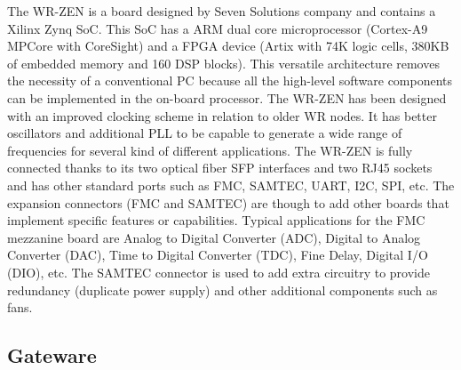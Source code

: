 \documentclass[review]{elsarticle}
\begin{document}
The WR-ZEN is a board designed by Seven Solutions company and contains a Xilinx Zynq SoC. This SoC has a ARM dual core microprocessor (Cortex-A9 MPCore with CoreSight) and a FPGA device (Artix with 74K logic cells, 380KB of embedded memory and 160 DSP blocks). This versatile architecture removes the necessity of a conventional PC because all the high-level software components can be implemented in the on-board processor. The WR-ZEN has been designed with an improved clocking scheme in relation to older WR nodes. It has better oscillators and additional PLL to be capable to generate a wide range of frequencies for several kind of different applications. The WR-ZEN is fully connected thanks to its two optical fiber SFP interfaces and two RJ45 sockets and has other standard ports such as FMC, SAMTEC, UART, I2C, SPI, etc. The expansion connectors (FMC and SAMTEC) are though to add other boards that implement specific features or capabilities. Typical applications for the FMC mezzanine board are Analog to Digital Converter (ADC), Digital to Analog Converter (DAC), Time to Digital Converter (TDC), Fine Delay, Digital I/O (DIO), etc. The SAMTEC connector is used to add extra circuitry to provide redundancy (duplicate power supply) and other additional components such as fans. 

\subsection{Gateware}

%
%
\end{document}
